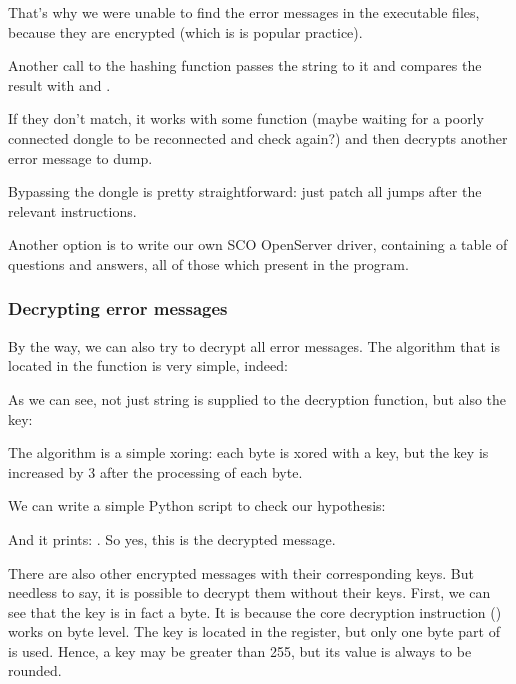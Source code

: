 That's why we were unable to find the error messages in the executable files, because they are encrypted
(which is is popular practice).

Another call to the  hashing function passes the
 string to it and compares the result with
 and .

If they don't match, it works with some  
function (maybe waiting for a poorly
connected dongle to be reconnected and check again?) and then decrypts another error message to dump.



Bypassing the dongle is pretty straightforward: just patch all jumps after the relevant \CMP instructions.

Another option is to write our own SCO OpenServer driver, containing a table of questions and answers, all of those which present in the program.

\subsubsection{Decrypting error messages}

By the way, we can also try to decrypt all error messages.
The algorithm that is located in the  function is very simple, indeed:



As we can see, 
not just string is supplied to the decryption function, but also the key:



The algorithm is a simple \gls{xoring}: each 
byte is xored with a key, but the key is increased by 3 after the processing of each byte.

We can write a simple Python script to check our hypothesis:



And it prints: .
So yes, this is the decrypted message.

There are also 
other encrypted messages with their corresponding keys.
But needless to say, it is possible 
to decrypt them without their keys.
First, we can see that the key 
is in fact a byte.
It is because the core decryption instruction
(\XOR) works on byte level. 
The key is located in the \ESI register, but only one byte part of \ESI is used.
Hence, a key may be greater than 255, 
but its value is always to be rounded.

